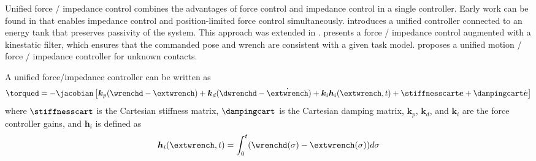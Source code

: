 Unified force / impedance control combines the advantages of force control and impedance control in a single controller.
Early work can be found in \cite{almeida1999force} that enables impedance control and position-limited force control simultaneously.
\cite{schindlbeck2015unified} introduces a unified controller connected to an energy tank that preserves passivity of the system.
This approach was extended in \cite{karacan2022passivity}.
\cite{marin2016unified} presents a force / impedance control augmented with a kinestatic filter, which ensures that the commanded pose and wrench are consistent with a given task model.
\cite{lin2021unified} proposes a unified motion / force / impedance controller for unknown contacts.

A unified force/impedance controller can be written as
\begin{equation}
    \torqued=-\jacobian\left[\boldsymbol{k}_p (\wrenchd-\extwrench)+\boldsymbol{k}_d (\dwrenchd-\dot{\extwrench})+\boldsymbol{k}_i \boldsymbol{h}_i(\extwrench,t) +\stiffnesscart \boldsymbol{e} + \dampingcart \dot{\boldsymbol{e}}\right]
\end{equation}
where $\stiffnesscart$ is the Cartesian stiffness matrix, $\dampingcart$ is the Cartesian damping matrix, $\boldsymbol{k}_p$, $\boldsymbol{k}_d$, and $\boldsymbol{k}_i$ are the force controller gains, and $\boldsymbol{h}_i$ is defined as
\begin{equation}
    \boldsymbol{h}_i(\extwrench,t)=\int_0^t (\wrenchd(\sigma)-\extwrench(\sigma))d\sigma
\end{equation}



